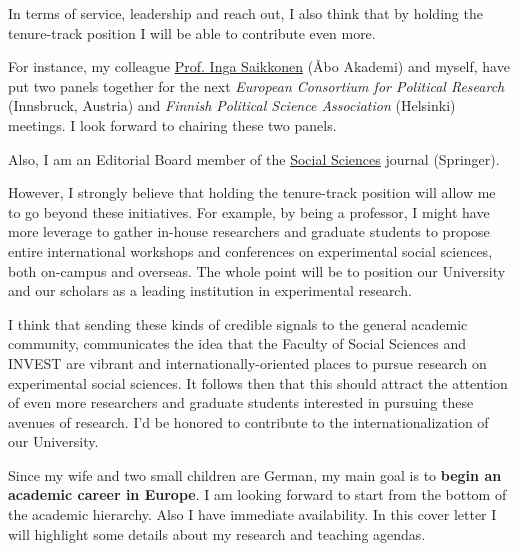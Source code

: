 \documentclass[10pt,stdletter,dateno,sigleft]{newlfm} %
\begin{document}
\begin{newlfm}
In terms of service, leadership and reach out, I also think that by holding the tenure-track position I will be able to contribute even more. 

For instance, my colleague \href{https://research.abo.fi/en/persons/inga-saikkonen}{Prof. Inga Saikkonen} (\AA bo Akademi) and myself, have put two panels together for the next \emph{European Consortium for Political Research} (Innsbruck, Austria) and \emph{Finnish Political Science Association} (Helsinki) meetings. I look forward to chairing these two panels. 

Also, I am an Editorial Board member of the \href{https://www.springer.com/journal/43545}{Social Sciences} journal (Springer). 

However, I strongly believe that holding the tenure-track position will allow me to go beyond these initiatives. For example, by being a professor, I might have more leverage to gather in-house researchers and graduate students to propose entire international workshops and conferences on experimental social sciences, both on-campus and overseas. The whole point will be to position our University and our scholars as a leading institution in experimental research. 

I think that sending these kinds of credible signals to the general academic community, communicates the idea that the Faculty of Social Sciences and INVEST are vibrant and internationally-oriented places to pursue research on experimental social sciences. It follows then that this should attract the attention of even more researchers and graduate students interested in pursuing these avenues of research. I'd be honored to contribute to the internationalization of our University.











Since my wife and two small children are German, my main goal is to {\bf begin an academic career in Europe}. I am looking forward to start from the bottom of the academic hierarchy. Also I have immediate availability. In this cover letter I will highlight some details about my research and teaching agendas.



{\unskip}


\vspace{-10cm}



\end{newlfm}
\end{document}
